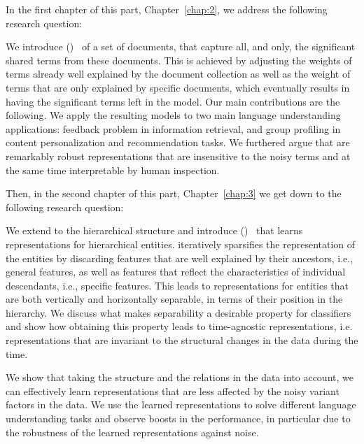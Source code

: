 In the first chapter of this part, Chapter~\ref{chap:2}, we address the following research question:
\begin{resqbox}
\emph{}
\end{resqbox}
We introduce \emph{\swlms} (\acswlm)~\citep{Dehghani:2016:SIGIR} of a set of documents, that capture all, and only, the significant shared terms from these documents.  This is achieved by adjusting the weights of terms already well explained by the document collection as well as the weight of terms that are only explained by specific documents, which eventually results in having the significant terms left in the model. 
Our main contributions are the following.
We apply the resulting models to two main language understanding applications: feedback problem in information retrieval\citep{Dehghani:CIKM2016:long, Dehghani:CIKM2016:short}, and group profiling in content personalization and recommendation tasks\citep{Dehghani:2016:CHIIR,Dehghani2016:trec}. We furthered argue that \acswlm are remarkably robust representations that are insensitive to the noisy terms and at the same time interpretable by human inspection. 

Then, in the second chapter of this part, Chapter~\ref{chap:3} we get down to the following research question:
\begin{resqbox}
\emph{}
\end{resqbox}
We extend \emph{\swlms} to the hierarchical structure and introduce \emph{\hswlms} (\achswlm)~\citep{Dehghani:2016:ICTIR, Dehghani:2016:CLEF} that learns representations for hierarchical entities. \achswlm iteratively sparsifies the representation of the entities by discarding features that are well explained by their ancestors, i.e., general features, as well as features that reflect the characteristics of individual descendants, i.e., specific features. This leads to representations for entities that are both vertically and horizontally separable, in terms of their position in the hierarchy. We discuss what makes separability a desirable property for classifiers and show how obtaining this property leads to time-agnostic representations, i.e.  representations that are invariant to the structural changes in the data during the time.

\medskip
We show that taking the structure and the relations in the data into account, we can effectively learn representations that are less affected by the noisy variant factors in the data. We use the learned representations to solve different language understanding tasks and observe boosts in the performance, in particular due to the robustness of the learned representations against noise.



